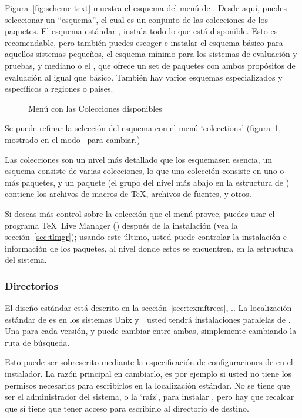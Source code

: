 \documentclass{article}
\begin{document}
Figura~\ref{fig:scheme-text} muestra el esquema del menú de \TL. Desde
aquí, puedes seleccionar un ``esquema'', el cual es un conjunto de las
colecciones de los paquetes. El esquema estándar ,
instala todo lo que está disponible. Esto es recomendable, pero
también puedes escoger e instalar el esquema básico 
para aquellos sistemas pequeños, el esquema mínimo 
para los sistemas de evaluación y pruebas, y mediano  o
el , que ofrece un set de paquetes con ambos propósitos
de evaluación al igual que básico. También hay varios esquemas
especializados y específicos a regiones o países.

\begin{figure}[tb]
\centering {}
\caption{Menú con las Colecciones disponibles}\label{fig:collections-gui}
\end{figure}

Se puede refinar la selección del esquema con el menú `colecctions'
(figura~\ref{fig:collections-gui}, mostrado en el modo \GUI\, para
cambiar.)

Las colecciones son un nivel más detallado que los esquemas\Dash en
esencia, un esquema consiste de varias colecciones, lo que una colección
consiste en uno o más paquetes, y un paquete (el grupo del nivel más
abajo en la estructura de \TL) contiene los archivos de macros de
\TeX{}, archivos de fuentes, y otros.

Si deseas más control sobre la colección que el menú provee, puedes
usar el programa \TeX\ Live Manager () después de la
instalación (vea la sección~\ref{sec:tlmgr}); usando este último,
usted puede controlar la instalación e información de los paquetes, al
nivel donde estos se encuentren, en la estructura del sistema.

\subsubsection{Directorios}
\label{sec:directories}

El diseño estándar está descrito en la sección~\ref{sec:texmftrees},
\p.\pageref{sec:texmftrees}. La localización estándar de
 es  en los sistemas
Unix y |%
usted tendrá instalaciones paralelas de \TL. Una para cada versión, y puede
cambiar entre ambas, simplemente cambiando la ruta de búsqueda. 

Esto puede ser sobrescrito mediante la especificación de
configuraciones
de  en el instalador. La razón principal en cambiarlo,
es por ejemplo si usted no tiene los permisos necesarios para
escribirlos en la localización estándar. No se tiene que ser el
administrador del sistema, o la `raíz', para instalar \TL, pero hay que recalcar que sí
tiene que tener acceso para escribirlo al directorio de destino. 
\end{document}
